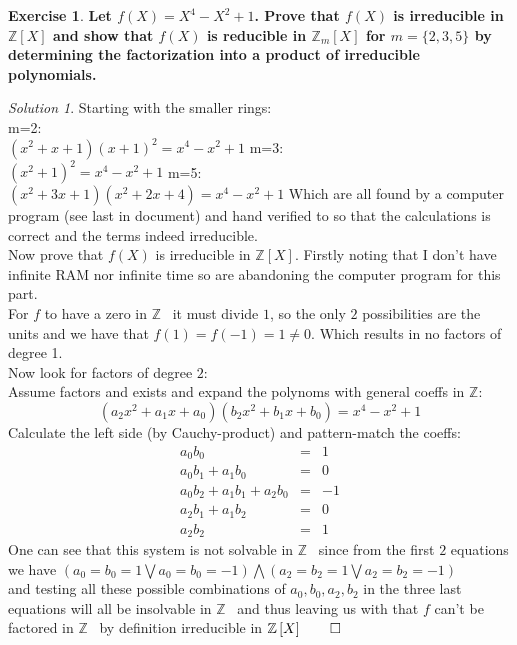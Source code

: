 \documentclass[a4paper,twoside=false,abstract=false,numbers=noenddot,
titlepage=false,headings=small,parskip=half,version=last]{scrartcl}
\theoremstyle{definition}
\newtheorem{exercise}{Exercise}
\theoremstyle{remark}
\newtheorem*{solution}{Solution}
\newcommand{\ZZ}{\ensuremath{\mathbb{Z}}}
\begin{document}
\begin{exercise}
{\bf
Let $f(X)=X^4-X^2+1$. Prove that $f(X)$ is irreducible in $\ZZ\left[X\right]$
and show that $f(X)$ is reducible in $\ZZ_m\left[X\right]$ for
$m=\{2,3,5\}$ by determining the factorization into a product of
irreducible polynomials.
}
\end{exercise}
\begin{solution}
Starting with the smaller rings:\\
m=2:\\
$(x^2+x+1)(x+1)^2=x^4-x^2+1$
m=3:\\
$(x^2+1)^2=x^4-x^2+1$
m=5:\\
$(x^2+3x+1)(x^2+2x+4)=x^4-x^2+1$
Which are all found by a computer program (see last in document) and hand verified to so that the
calculations is correct and the terms indeed irreducible.\\

Now prove that $f(X)$ is irreducible in $\ZZ\left[X\right]$. Firstly noting
that I don't have infinite RAM nor infinite time so are abandoning the
computer program for this part.\\
For $f$ to have a
zero in \ZZ ~ it must divide $1$, so the only $2$ possibilities are the units and we
have that $f(1)=f(-1)=1\neq0$. Which results in no factors of degree 1.\\
Now look for factors of degree $2$:\\
Assume factors and exists and expand the polynoms with general coeffs in \ZZ:\\
\begin{equation}
    (a_2x^2+a_1x+a_0)(b_2x^2+b_1x+b_0)=x^4-x^2+1
\end{equation}
Calculate the left side (by Cauchy-product) and pattern-match the coeffs:\\
\begin{eqnarray}
    a_0b_0&=&1 \\
    a_0b_1+a_1b_0&=&0\\
    a_0b_2+a_1b_1+a_2b_0&=&-1\\
    a_2b_1+a_1b_2&=&0\\ 
    a_2b_2&=&1
\end{eqnarray}
One can see that this system is not solvable in \ZZ~ since from the first $2$
equations we have $(a_0=b_0=1 \bigvee a_0=b_0=-1)\bigwedge(a_2=b_2=1\bigvee
a_2=b_2=-1)$\\ and testing all these possible combinations of $a_0,b_0,a_2,b_2$
in the three last equations will all be insolvable in \ZZ~ and thus leaving us
with that $f$ can't be factored in \ZZ~ by definition irreducible in
$\ZZ\left[X\right] \qed$

\end{solution}
\end{document}
